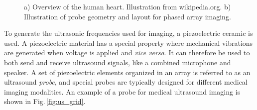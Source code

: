 \begin{figure}
\centering
{}
\caption{a) Overview of the human heart. Illustration from wikipedia.org. b) Illustration of probe geometry and layout for phased array imaging.}
\end{figure}


To generate the ultrasonic frequencies used for imaging, a piezoelectric ceramic is used. A piezoelectric material has a special property where mechanical vibrations are generated when voltage is applied and \textit{vice versa}. It can therefore be used to both send and receive ultrasound signals, like a combined microphone and speaker. A set of piezoelectric elements organized in an array is referred to as an ultrasound \textit{probe}, and special probes are typically designed for different medical imaging modalities. An example of a probe for medical ultrasound imaging is shown in Fig.\,\ref{fig:us_grid}. %

